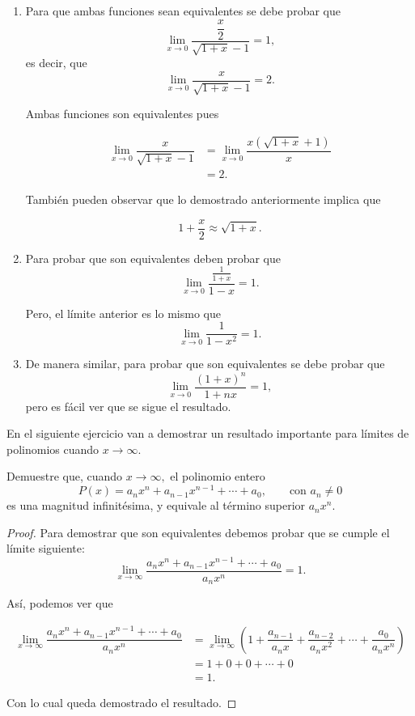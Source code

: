  \begin{example}
 	\begin{enumerate}
 		\item Para que ambas funciones sean equivalentes se debe probar que
 		\[
 		\lim\limits_{x\to 0}\dfrac{\dfrac{x}{2}}{\sqrt{1+x}-1}=1,
 		\]
 		es decir, que
 		\[
 		\lim\limits_{x\to 0}\dfrac{x}{\sqrt{1+x}-1}=2.
 		\]
 		
 		Ambas funciones son equivalentes pues
 		
 		\begin{align*}
 		\lim\limits_{x\to 0}\dfrac{x}{\sqrt{1+x}-1}&=\lim\limits_{x\to 0}\dfrac{x(\sqrt{1+x}+1)}{x}\\
 		&=2.
 		\end{align*}
 		
 		Tambi\'en pueden observar que lo demostrado anteriormente implica que
 		
 		\[
 		1+\dfrac{x}{2}\approx\sqrt{1+x}.
 		\]
 		
 		\item Para probar que son equivalentes deben probar que
 		\[
 		\lim\limits_{x\to 0}\dfrac{\frac{1}{1+x}}{1-x}=1.
 		\]
 		
 		Pero, el l\'imite anterior es lo mismo que
 		\[
 		\lim\limits_{x\to 0}\dfrac{1}{1-x^2}=1.
 		\]
 		
 		\item De manera similar, para probar que son equivalentes se debe probar que
 		\[
 		\lim\limits_{x\to 0}\dfrac{(1+x)^n}{1+nx}=1,
 		\]
 		pero es f\'acil ver que se sigue el resultado.
 	\end{enumerate}
 \end{example}
 
 En el siguiente ejercicio van a demostrar un resultado importante para l\'imites de polinomios cuando \(x\to\infty.\)\newline
 
 \begin{exercise}
 	Demuestre que, cuando \(x\to\infty,\) el polinomio entero
 	\[
 	P(x)=a_nx^n+a_{n-1}x^{n-1}+\cdots+a_0,\qquad\text{con }a_n\neq 0
 	\]
 	es una magnitud infinit\'esima, y equivale al t\'ermino superior \(a_nx^n.\)
 \end{exercise}
 
 \begin{proof}
 	Para demostrar que son equivalentes debemos probar que se cumple el l\'imite siguiente:
 	\[
 	\lim\limits_{x\to\infty}\dfrac{a_nx^n+a_{n-1}x^{n-1}+\cdots+a_0}{a_nx^n}=1.
 	\]
 	
 	As\'i, podemos ver que
 	
 	\begin{align*}
 	\lim\limits_{x\to\infty}\dfrac{a_nx^n+a_{n-1}x^{n-1}+\cdots+a_0}{a_nx^n}&=\lim\limits_{x\to\infty}\left(1+\dfrac{a_{n-1}}{a_nx}+\dfrac{a_{n-2}}{a_nx^2}+\cdots+\dfrac{a_0}{a_nx^n}\right)\\
 	&=1+0+0+\cdots+0\\
 	&=1.
 	\end{align*}
 	
 	Con lo cual queda demostrado el resultado.
 \end{proof}
 
